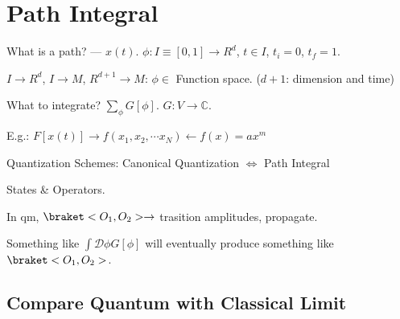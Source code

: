 
\chapter{Path Integral}

\begin{enumext}[label = *]
  \item What is a path? --- $x(t)$.
  $\phi: I \equiv [0,1] \to R^d$, $t \in I$, $t_i = 0$, $t_f = 1$.
  
  $I \to R^d$, $I \to M$, $R^{d+1} \to M$: $\phi \in$ Function space.
  ($d + 1$: dimension and time)
  \item What to integrate? $\sum_\phi G[\phi]$. $G: V \to \mathbb C$.

  E.g.: $F[x(t)] \to f(x_1,x_2, \cdots x_N) \leftarrow f(x) = ax^m $
  \item Quantization Schemes: Canonical Quantization $\Leftrightarrow$ Path Integral

  States \& Operators.

  In qm, $\braket<O_1,O_2> \to$ trasition amplitudes, propagate.

  Something like $\int \mathcal D\phi G[\phi]$ will eventually produce something like $\braket<O_1,O_2>$.
\end{enumext}

\section{Compare Quantum with Classical Limit}

